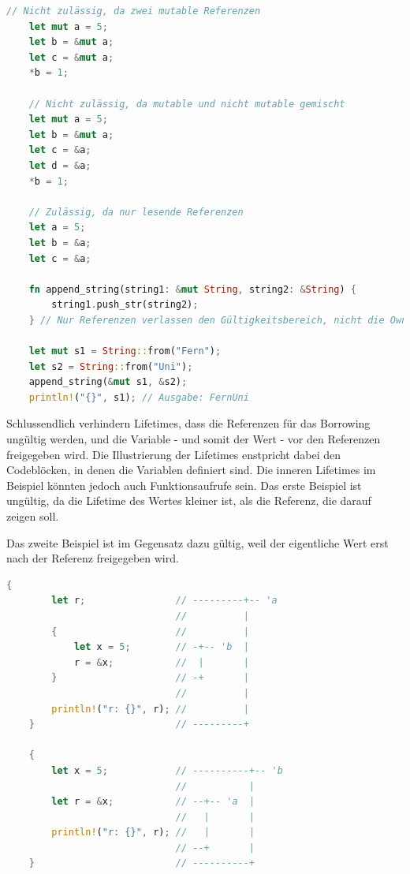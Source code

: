 \documentclass[11pt,a4paper, ngerman]{article}
\begin{document}
\begin{lstlisting}[language=rust, caption={borrowing}]
    // Nicht zulässig, da zwei mutable Referenzen
    let mut a = 5;
    let b = &mut a;
    let c = &mut a;
    *b = 1;

    // Nicht zulässig, da mutable und nicht mutable gemischt
    let mut a = 5;
    let b = &mut a;
    let c = &a;
    let d = &a;
    *b = 1;

    // Zulässig, da nur lesende Referenzen
    let a = 5;
    let b = &a;
    let c = &a;

    fn append_string(string1: &mut String, string2: &String) {
        string1.push_str(string2);
    } // Nur Referenzen verlassen den Gültigkeitsbereich, nicht die Owner!

    let mut s1 = String::from("Fern");
    let s2 = String::from("Uni");
    append_string(&mut s1, &s2);
    println!("{}", s1); // Ausgabe: FernUni
\end{lstlisting}

Schlussendlich verhindern Lifetimes, dass die Referenzen für das Borrowing ungültig werden, und die Variable - und somit der Wert - vor den Referenzen freigegeben wird. Die Illustrierung der Lifetimes enstpricht dabei den Codeblöcken, in denen die Variablen definiert sind. Die inneren Lifetimes im Beispiel könnten jedoch auch Funktionsaufrufe sein. Das erste Beispiel ist ungültig, da die Lifetime des Wertes kleiner ist, als die Referenz, die darauf zeigen soll.

Das zweite Beispiel ist im Gegensatz dazu gültig, weil der eigentliche Wert erst nach der Referenz freigegeben wird.

\newpage

\begin{lstlisting}[language=rust, caption={Lifetime Veranschaulichung \cite{LifetimeEx}}]
    {
        let r;                // ---------+-- 'a
                              //          |
        {                     //          |
            let x = 5;        // -+-- 'b  |
            r = &x;           //  |       |
        }                     // -+       |
                              //          |
        println!("r: {}", r); //          |
    }                         // ---------+

    {
        let x = 5;            // ----------+-- 'b
                              //           |
        let r = &x;           // --+-- 'a  |
                              //   |       |
        println!("r: {}", r); //   |       |
                              // --+       |
    }                         // ----------+
\end{lstlisting}
\end{document}
